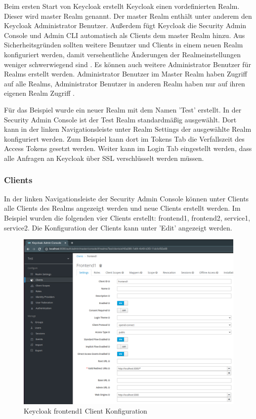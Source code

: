 Beim ersten Start von Keycloak erstellt Keycloak einen vordefinierten Realm. Dieser wird master Realm genannt. Der master Realm enthält unter anderem den Keycloak Administrator Benutzer. Außerdem fügt Keycloak die Security Admin Console und Admin CLI automatisch als Clients dem master Realm hinzu. Aus Sicherheitsgründen sollten weitere Benutzer und Clients in einem neuen Realm konfiguriert werden, damit versehentliche Änderungen der Realmeinstellungen weniger schwerwiegend sind \cite{EB47}. Es können auch weitere Administrator Benutzer für Realms erstellt werden. Administrator Benutzer im Master Realm haben Zugriff auf alle Realms,  Administrator Benutzer in anderen Realm haben nur auf ihren eigenen Realm Zugriff \cite{EB47}.

Für das Beispiel wurde ein neuer Realm mit dem Namen 'Test' erstellt. In der Security Admin Console ist der Test Realm standardmäßig ausgewählt. Dort kann in der linken Navigationsleiste unter Realm Settings der ausgewählte Realm konfiguriert werden. Zum Beispiel kann dort im Tokens Tab die Verfallszeit des Access Tokens gesetzt werden. Weiter kann im Login Tab eingestellt werden, dass alle Anfragen an Keycloak über SSL verschlüsselt werden müssen. %

\subsubsection{Clients}

In der linken Navigationsleiste der Security Admin Console können unter Clients alle Clients des Realms angezeigt werden und neue Clients erstellt werden. Im Beispiel wurden die folgenden vier Clients erstellt: frontend1, frontend2, service1, service2. Die Konfiguration der Clients kann unter 'Edit' angezeigt werden.

\begin{figure}[!ht]
	\centering
	\includegraphics[width=1\textwidth]{Images/Ebert/KeycloakClientConfig.PNG}
	\caption{Keycloak frontend1 Client Konfiguration}
	\label{fig:EB_Keycloak frontend1 Client Konfiguration}
\end{figure}

